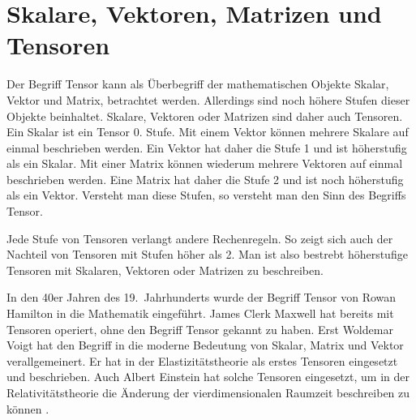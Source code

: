 \section{Skalare, Vektoren, Matrizen und Tensoren\label{spannung:section:Skalare,_Vektoren,_Matrizen_und_Tensoren}}
Der Begriff Tensor kann als Überbegriff der mathematischen Objekte Skalar, Vektor und Matrix, betrachtet werden.
%
Allerdings sind noch höhere Stufen dieser Objekte beinhaltet.
Skalare, Vektoren oder Matrizen sind daher auch Tensoren.
Ein Skalar ist ein Tensor 0. Stufe.
%
Mit einem Vektor können mehrere Skalare auf einmal beschrieben werden.
Ein Vektor hat daher die Stufe 1 und ist höherstufig als ein Skalar.
Mit einer Matrix können wiederum mehrere Vektoren auf einmal beschrieben werden.
Eine Matrix hat daher die Stufe 2 und ist noch höherstufig als ein Vektor.
Versteht man diese Stufen, so versteht man den Sinn des Begriffs Tensor.

Jede Stufe von Tensoren verlangt andere Rechenregeln.
So zeigt sich auch der Nachteil von Tensoren mit Stufen höher als 2.
Man ist also bestrebt höherstufige Tensoren mit Skalaren, Vektoren oder Matrizen zu beschreiben.

In den 40er Jahren des 19.~Jahrhunderts wurde der Begriff Tensor von Rowan Hamilton in die Mathematik eingeführt.
%
James Clerk Maxwell hat bereits mit Tensoren operiert, ohne den Begriff Tensor gekannt zu haben.
%
Erst Woldemar Voigt hat den Begriff in die moderne Bedeutung von Skalar, Matrix und Vektor verallgemeinert.
Er hat in der Elastizitätstheorie als erstes Tensoren eingesetzt und beschrieben.
%
Auch Albert Einstein hat solche Tensoren eingesetzt,
%
um in der Relativitätstheorie die Änderung der vierdimensionalen Raumzeit beschreiben zu können
%
%
\cite{spannung:Tensor}.

